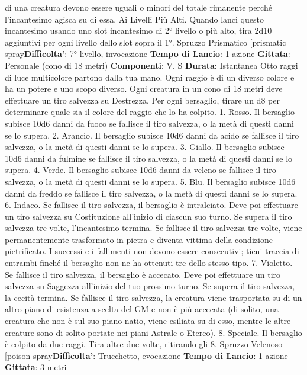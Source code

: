 \begin{multicols}{2}
di una creatura devono essere uguali o minori del totale
rimanente perché l’incantesimo agisca su di essa.
Ai Livelli Più Alti. Quando lanci questo incantesimo
usando uno slot incantesimo di 2° livello o più alto, tira
2d10 aggiuntivi per ogni livello dello slot sopra il 1°.
Spruzzo Prismatico
[prismatic spray\textbf{Difficolta'}:
7° livello, invocazione
\textbf{Tempo di Lancio}: 1 azione
\textbf{Gittata}: Personale (cono di 18 metri)
\textbf{Componenti}: V, S
\textbf{Durata}: Istantanea
Otto raggi di luce multicolore partono dalla tua mano.
Ogni raggio è di un diverso colore e ha un potere e uno
scopo diverso. Ogni creatura in un cono di 18 metri
deve effettuare un tiro salvezza su Destrezza. Per ogni
bersaglio, tirare un d8 per determinare quale sia il
colore del raggio che lo ha colpito.
1. Rosso. Il bersaglio subisce 10d6 danni da fuoco se
fallisce il tiro salvezza, o la metà di questi danni se lo
supera.
2. Arancio. Il bersaglio subisce 10d6 danni da acido se
fallisce il tiro salvezza, o la metà di questi danni se lo
supera.
3. Giallo. Il bersaglio subisce 10d6 danni da fulmine se
fallisce il tiro salvezza, o la metà di questi danni se lo
supera.
4. Verde. Il bersaglio subisce 10d6 danni da veleno se
fallisce il tiro salvezza, o la metà di questi danni se lo
supera.
5. Blu. Il bersaglio subisce 10d6 danni da freddo se
fallisce il tiro salvezza, o la metà di questi danni se lo
supera.
6. Indaco. Se fallisce il tiro salvezza, il bersaglio è
intralciato. Deve poi effettuare un tiro salvezza su
Costituzione all’inizio di ciascun suo turno. Se supera il
tiro salvezza tre volte, l’incantesimo termina. Se fallisce
il tiro salvezza tre volte, viene permanentemente
trasformato in pietra e diventa vittima della condizione
pietrificato. I successi e i fallimenti non devono essere
consecutivi; tieni traccia di entrambi finché il bersaglio
non ne ha ottenuti tre dello stesso tipo.
7. Violetto. Se fallisce il tiro salvezza, il bersaglio è
accecato. Deve poi effettuare un tiro salvezza su
Saggezza all’inizio del tuo prossimo turno. Se supera il
tiro salvezza, la cecità termina. Se fallisce il tiro
salvezza, la creatura viene trasportata su di un altro
piano di esistenza a scelta del GM e non è più accecata
(di solito, una creatura che non è sul suo piano natio,
viene esiliata su di esso, mentre le altre creature sono
di solito portate nei piani Astrale o Etereo).
8. Speciale. Il bersaglio è colpito da due raggi. Tira
altre due volte, ritirando gli 8.
Spruzzo Velenoso
[poison spray\textbf{Difficolta'}:
Trucchetto, evocazione
\textbf{Tempo di Lancio}: 1 azione
\textbf{Gittata}: 3 metri

\end{multicols}
